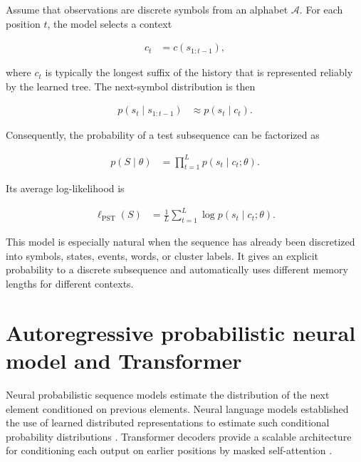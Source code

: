 \documentclass[a4paper]{article}
\begin{document}
        Assume that observations are discrete symbols from an alphabet \(\mathcal{A}\). For each position \(t\), the model selects a context

        \begin{align}
            c_t
            &=
            c(s_{1:t-1}),
        \end{align}

        \noindent
        where \(c_t\) is typically the longest suffix of the history that is represented reliably by the learned tree. The next-symbol distribution is then

        \begin{align}
            p(s_t\mid s_{1:t-1})
            &\approx
            p(s_t\mid c_t).
        \end{align}

        \noindent
        Consequently, the probability of a test subsequence can be factorized as

        \begin{align}
            p(S\mid\theta)
            &=
            \prod_{t=1}^{L}
            p(s_t\mid c_t;\theta).
        \end{align}

        \noindent
        Its average log-likelihood is

        \begin{align}
            \ell_{\mathrm{PST}}(S)
            &=
            \frac{1}{L}
            \sum_{t=1}^{L}
            \log p(s_t\mid c_t;\theta).
        \end{align}

        \noindent
        This model is especially natural when the sequence has already been discretized into symbols, states, events, words, or cluster labels. It gives an explicit probability to a discrete subsequence and automatically uses different memory lengths for different contexts.

    \section{Autoregressive probabilistic neural model and Transformer}

        Neural probabilistic sequence models estimate the distribution of the next element conditioned on previous elements. Neural language models established the use of learned distributed representations to estimate such conditional probability distributions \cite{bengio-2003-a-neural-probabilistic-language-model}. Transformer decoders provide a scalable architecture for conditioning each output on earlier positions by masked self-attention \cite{vaswani-2017-attention-is-all-you-need}.
\end{document}
